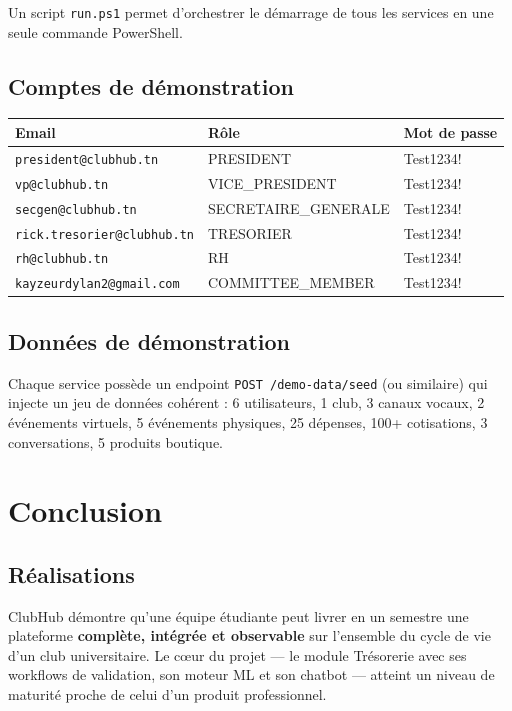 \documentclass[11pt,a4paper]{report}
\begin{document}
Un script \texttt{run.ps1} permet d'orchestrer le démarrage de tous les
services en une seule commande PowerShell.

\section{Comptes de démonstration}

\begin{tabular}{lll}
\toprule
\textbf{Email} & \textbf{Rôle} & \textbf{Mot de passe} \\
\midrule
\texttt{president@clubhub.tn}        & PRESIDENT             & Test1234! \\
\texttt{vp@clubhub.tn}                & VICE\_PRESIDENT       & Test1234! \\
\texttt{secgen@clubhub.tn}            & SECRETAIRE\_GENERALE  & Test1234! \\
\texttt{rick.tresorier@clubhub.tn}    & TRESORIER             & Test1234! \\
\texttt{rh@clubhub.tn}                & RH                    & Test1234! \\
\texttt{kayzeurdylan2@gmail.com}      & COMMITTEE\_MEMBER     & Test1234! \\
\bottomrule
\end{tabular}

\section{Données de démonstration}

Chaque service possède un endpoint \texttt{POST /demo-data/seed} (ou similaire)
qui injecte un jeu de données cohérent : 6 utilisateurs, 1 club, 3 canaux
vocaux, 2 événements virtuels, 5 événements physiques, 25 dépenses, 100+
cotisations, 3 conversations, 5 produits boutique.


\chapter{Conclusion}

\section{Réalisations}

ClubHub démontre qu'une équipe étudiante peut livrer en un semestre une
plateforme \textbf{complète, intégrée et observable} sur l'ensemble du cycle
de vie d'un club universitaire. Le cœur du projet — le module Trésorerie avec
ses workflows de validation, son moteur ML et son chatbot — atteint un niveau
de maturité proche de celui d'un produit professionnel.
\end{document}
